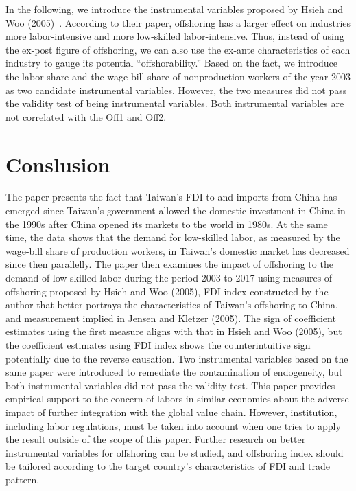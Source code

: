 \documentclass{article}
\begin{document}
In the following, we introduce the instrumental variables proposed by Hsieh and Woo (2005)~\cite{hsieh}. According to their paper, offshoring has a larger effect on industries more labor-intensive and more low-skilled labor-intensive. Thus, instead of using the ex-post figure of offshoring, we can also use the ex-ante characteristics of each industry to gauge its potential “offshorability.” Based on the fact, we introduce the labor share and the wage-bill share of nonproduction workers of the year 2003 as two candidate instrumental variables. However, the two measures did not pass the validity test of being instrumental variables. Both instrumental variables are not correlated with the Off1 and Off2.\par


\section{Conslusion}

The paper presents the fact that Taiwan’s FDI to and imports from China has emerged since Taiwan’s government allowed the domestic investment in China in the 1990s after China opened its markets to the world in 1980s. At the same time, the data shows that the demand for low-skilled labor, as measured by the wage-bill share of production workers, in Taiwan’s domestic market has decreased since then parallelly. The paper then examines the impact of offshoring to the demand of low-skilled labor during the period 2003 to 2017 using measures of offshoring proposed by Hsieh and Woo (2005), FDI index constructed by the author that better portrays the characteristics of Taiwan’s offshoring to China, and measurement implied in Jensen and Kletzer (2005). The sign of coefficient estimates using the first measure aligns with that in Hsieh and Woo (2005), but the coefficient estimates using FDI index shows the counterintuitive sign potentially due to the reverse causation. Two instrumental variables based on the same paper were introduced to remediate the contamination of endogeneity, but both instrumental variables did not pass the validity test. This paper provides empirical support to the concern of labors in similar economies about the adverse impact of further integration with the global value chain. However, institution, including labor regulations, must be taken into account when one tries to apply the result outside of the scope of this paper. Further research on better instrumental variables for offshoring can be studied, and offshoring index should be tailored according to the target country’s characteristics of FDI and trade pattern.\par



\end{document}
